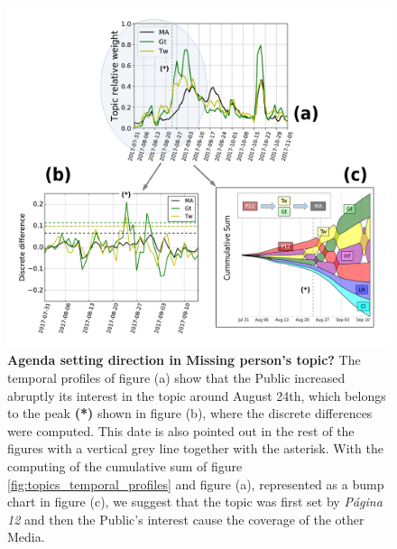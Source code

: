 \begin{figure}
\includegraphics[width = \textwidth]{images/Fig8.pdf}
\caption{\textbf{Agenda setting direction in Missing person's topic?}
The temporal profiles of figure (a) show that the Public increased abruptly its interest in the topic around August 24th, which belongs to the peak \textbf{(*)} shown in figure (b), where the discrete differences were computed. 
This date is also pointed out in the rest of the figures with a vertical grey line together with the asterisk. 
With the computing of the cumulative sum of figure \ref{fig:topics_temporal_profiles} and figure (a), represented as a bump chart in figure (c), we suggest that the topic was first set by \emph{Página 12} and then the Public's interest cause the coverage of the other Media.
}
\label{fig:Maldonado_setagenda}
\end{figure}




